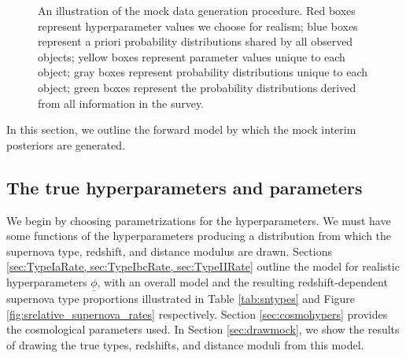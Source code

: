 \documentclass[12pt, onecolumn]{emulateapj}
\newcommand{\textul}{\underline}
\begin{document}
\begin{figure}
\begin{center}
\begin{tikzpicture}[node distance=1cm]
\end{tikzpicture}
\caption{An illustration of the mock data generation procedure.  Red boxes represent hyperparameter values we choose for realism; blue boxes represent a priori probability distributions shared by all observed objects; yellow boxes represent parameter values unique to each object; gray boxes represent probability distributions unique to each object; green boxes represent the probability distributions derived from all information in the survey.}
\label{fig:simflow}
\end{center}
\end{figure}

In this section, we outline the forward model by which the mock interim posteriors are generated.  

\subsection{The true hyperparameters and parameters}
\label{sec:true_hypers}

We begin by choosing parametrizations for the hyperparameters.  We must have some functions of the hyperparameters producing a distribution from which the supernova type, redshift, and distance modulus are drawn.  Sections \ref{sec:TypeIaRate, sec:TypeIbcRate, sec:TypeIIRate} outline the model for realistic hyperparameters $\textul{\phi}$, with an overall model and the resulting redshift-dependent supernova type proportions illustrated in Table \ref{tab:sntypes} and Figure \ref{fig:srelative_supernova_rates} respectively.  Section \ref{sec:cosmohypers} provides the cosmological parameters used.  In Section \ref{sec:drawmock}, we show the results of drawing the true types, redshifts, and distance moduli from this model.

\end{document}
